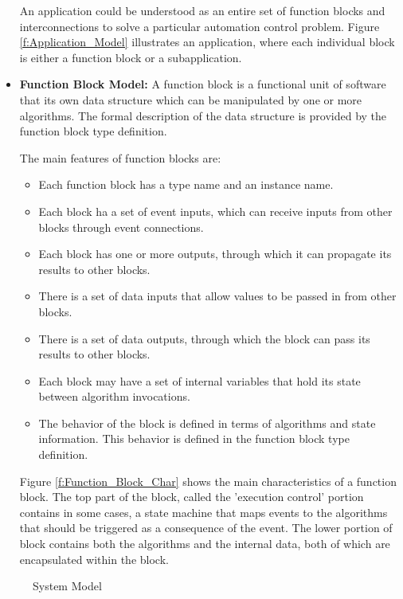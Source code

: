 \begin{itemize}
An application could be understood as an entire set of function
blocks and interconnections to solve a particular automation
control problem. Figure \ref{f:Application_Model} illustrates an
application, where each individual block is either a function
block or a subapplication.

\item {\bf Function Block Model:} A function block is a functional
unit of software that its own data structure which can be
manipulated by one or more algorithms. The formal description of
the data structure is provided by the function block type
definition.

The main features of function blocks are:
\begin{itemize}
\item Each function block has a type name and an instance name.
\item Each block ha a set of event inputs, which can receive
inputs from other blocks through event connections.
\item Each block has one or more outputs, through which it can
propagate its results to other blocks.
\item There is a set of data inputs that allow values to be passed
in from other blocks.
\item There is a set of data outputs, through which the block can
pass its results to other blocks.
\item Each block may have a set of internal variables that hold
its state between algorithm invocations.
\item The behavior of the block is defined in terms of algorithms
and state information. This behavior is defined in the function
block type definition.
\end{itemize}

Figure \ref{f:Function_Block_Char} shows the main characteristics
of a function block. The top part of the block, called the
'execution control' portion contains in some cases, a state
machine that maps events to the algorithms that should be
triggered as a consequence of the event. The lower portion of
block contains both the algorithms and the internal data, both of
which are encapsulated within the block.

\end{itemize}

%
\begin{figure}
\begin{center}
 \caption[System
Model]{System Model {\protect ~\cite{iec:61499:2000}}}
\label{f:System_Model}
\end{center}
\end{figure}
%

